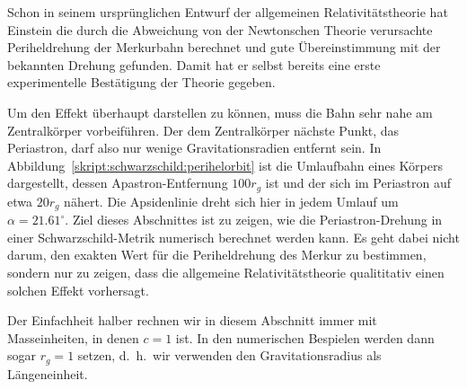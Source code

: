 
Schon in seinem ursprünglichen Entwurf der allgemeinen Relativitätstheorie
hat Einstein die durch die Abweichung von der Newtonschen Theorie
verursachte Periheldrehung der Merkurbahn berechnet und gute Übereinstimmung
mit der bekannten Drehung gefunden.
Damit hat er selbst bereits eine erste experimentelle Bestätigung
der Theorie gegeben.

Um den Effekt überhaupt darstellen zu können, muss die Bahn sehr nahe
am Zentralkörper vorbeiführen.
Der dem Zentralkörper nächste Punkt, das Periastron, darf
also nur wenige Gravitationsradien entfernt sein.
In Abbildung~\ref{skript:schwarzschild:perihelorbit} ist die
Umlaufbahn eines Körpers dargestellt, dessen Apastron-Entfernung
$100 r_g$ ist und der sich im Periastron auf etwa $20r_g$ 
nähert.
Die Apsidenlinie dreht sich hier in jedem Umlauf um $\alpha = 21.61^\circ$.
Ziel dieses Abschnittes ist zu zeigen, wie die Periastron-Drehung
in einer Schwarzschild-Metrik numerisch berechnet werden kann.
Es geht dabei nicht darum, den exakten Wert für die Periheldrehung
des Merkur zu bestimmen,
sondern nur zu zeigen, dass die allgemeine Relativitätstheorie
qualititativ einen solchen Effekt vorhersagt.

Der Einfachheit halber rechnen wir in diesem Abschnitt immer mit
Masseinheiten, in denen $c=1$ ist.
In den numerischen Bespielen werden dann sogar $r_g=1$ setzen,
d.~h.~wir verwenden den Gravitationsradius als Längeneinheit.

